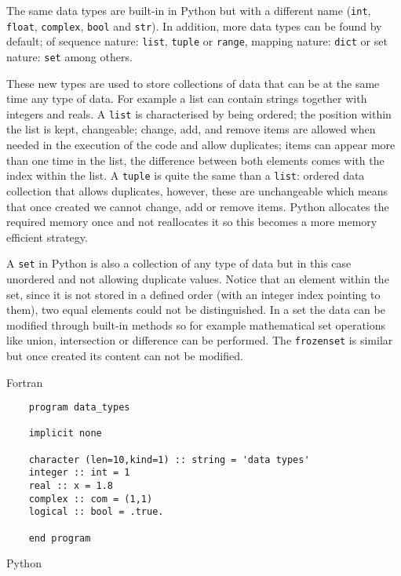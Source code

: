 The same data types are built-in in Python but with a different name (\texttt{int}, \texttt{float}, \texttt{complex}, \texttt{bool} and \texttt{str}). 
In addition, more data types can be found by default; of sequence nature: \texttt{list}, \texttt{tuple} or \texttt{range}, mapping nature: \texttt{dict} or set nature: \texttt{set} among others. 

These new types are used to store collections of data that can be at the same time any type of data. For example a list can contain strings together with integers and reals. 
A \texttt{list} is characterised by being ordered; the position within the list is kept, changeable; change, add, and remove items are allowed when needed in the execution of the code and allow duplicates; items can appear more than one time in the list, the difference between both elements comes with the index within the list. 
A \texttt{tuple} is quite the same than a \texttt{list}: ordered data collection that allows duplicates, however, these are unchangeable which means that once created we cannot change, add or remove items. 
Python allocates the required memory once and not reallocates it so this becomes a more memory efficient strategy.

A \texttt{set} in Python is also a collection of any type of data but in this case unordered and not allowing duplicate values. 
Notice that an element within the set, since it is not stored in a defined order (with an integer index pointing to them), two equal elements could not be distinguished.
In a set the data can be modified through built-in methods so for example mathematical set operations like union, intersection or difference can be performed.
The \texttt{frozenset} is similar but once created its content can not be modified. 



Fortran

\begin{verbatim}
    program data_types
    
    implicit none
    
    character (len=10,kind=1) :: string = 'data types'
    integer :: int = 1
    real :: x = 1.8
    complex :: com = (1,1)
    logical :: bool = .true.
    
    end program
\end{verbatim}







Python

